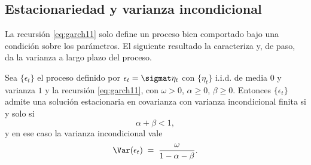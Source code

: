 \subsection{Estacionariedad y varianza incondicional}
\label{sec:garch-estac}

La recursión \eqref{eq:garch11} solo define un proceso bien comportado bajo una condición sobre los parámetros. El siguiente resultado la caracteriza y, de paso, da la varianza a largo plazo del proceso.

\begin{teorema}
\label{teo:garch-estac}
Sea $\{\epsilon_t\}$ el proceso definido por $\epsilon_t = \sigmat \eta_t$ con $\{\eta_t\}$ i.i.d. de media $0$ y varianza $1$ y la recursión \eqref{eq:garch11}, con $\omega > 0$, $\alpha \ge 0$, $\beta \ge 0$. Entonces $\{\epsilon_t\}$ admite una solución estacionaria en covarianza con varianza incondicional finita si y solo si
\[
\alpha + \beta < 1,
\]
y en ese caso la varianza incondicional vale
\[
\Var(\epsilon_t) \;=\; \frac{\omega}{1 - \alpha - \beta}.
\]
\end{teorema}

